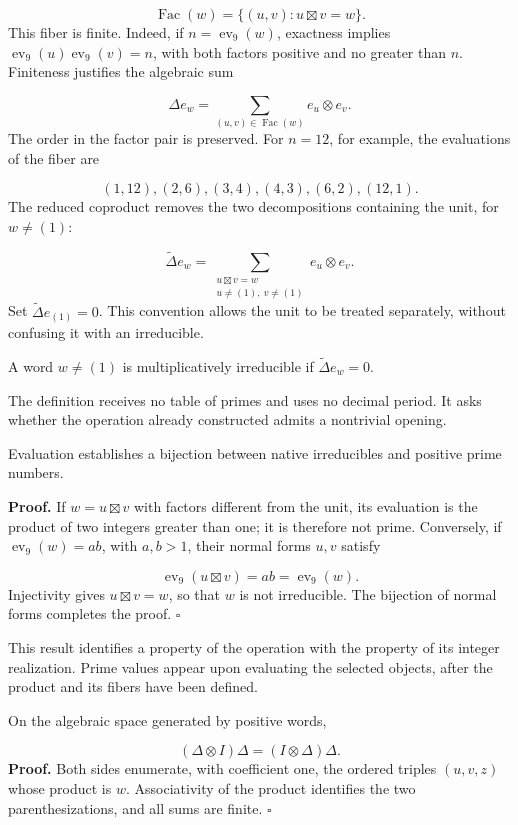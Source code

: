 \[
\operatorname{Fac}(w)=\{(u,v):u\boxtimes v=w\}.
\]
This fiber is finite. Indeed, if $n=\operatorname{ev}_9(w)$, exactness implies $\operatorname{ev}_9(u)\operatorname{ev}_9(v)=n$, with both factors positive and no greater than $n$. Finiteness justifies the algebraic sum

\[
\Delta e_w=\sum_{(u,v)\in\operatorname{Fac}(w)}e_u\otimes e_v.
\]
The order in the factor pair is preserved. For $n=12$, for example, the evaluations of the fiber are

\[
(1,12),(2,6),(3,4),(4,3),(6,2),(12,1).
\]
The reduced coproduct removes the two decompositions containing the unit, for $w\ne(1)$:

\[
\widetilde\Delta e_w
=\sum_{\substack{u\boxtimes v=w\\u\ne(1),\ v\ne(1)}}e_u\otimes e_v.
\]
Set $\widetilde\Delta e_{(1)}=0$. This convention allows the unit to be treated separately, without confusing it with an irreducible.

A word $w\ne(1)$ is multiplicatively irreducible if $\widetilde\Delta e_w=0$.

The definition receives no table of primes and uses no decimal period. It asks whether the operation already constructed admits a nontrivial opening.

Evaluation establishes a bijection between native irreducibles and positive prime numbers.

\textbf{Proof.} If $w=u\boxtimes v$ with factors different from the unit, its evaluation is the product of two integers greater than one; it is therefore not prime. Conversely, if $\operatorname{ev}_9(w)=ab$, with $a,b>1$, their normal forms $u,v$ satisfy

\[
\operatorname{ev}_9(u\boxtimes v)=ab=\operatorname{ev}_9(w).
\]
Injectivity gives $u\boxtimes v=w$, so that $w$ is not irreducible. The bijection of normal forms completes the proof. \hfill\(\square\)

This result identifies a property of the operation with the property of its integer realization. Prime values appear upon evaluating the selected objects, after the product and its fibers have been defined.

On the algebraic space generated by positive words,

\[
(\Delta\otimes I)\Delta=(I\otimes\Delta)\Delta.
\]
\textbf{Proof.} Both sides enumerate, with coefficient one, the ordered triples $(u,v,z)$ whose product is $w$. Associativity of the product identifies the two parenthesizations, and all sums are finite. \hfill\(\square\)


